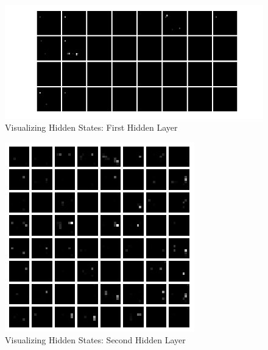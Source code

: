 \documentclass[10pt,twocolumn,letterpaper]{article}
\begin{document}
\begin{figure}[H]
\center
\includegraphics[width=\columnwidth]{layer1}
\caption{
Visualizing Hidden States: First Hidden Layer
}\label{fig:layer1}
\end{figure}

\begin{figure}[H]
\center
\includegraphics[width=\columnwidth]{layer2}
\caption{
Visualizing Hidden States: Second Hidden Layer
}\label{fig:layer2}
\end{figure}
\end{document}
